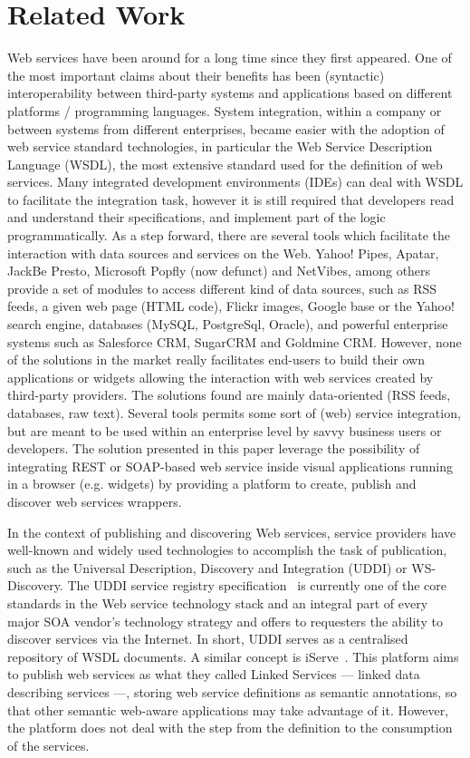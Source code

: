 
\section{Related Work}
\label{sec:related_work}

Web services have been around for a long time since they first appeared.
One of the most important claims about their benefits has been (syntactic) interoperability between third-party systems and applications based on different platforms / programming languages. 
System integration, within a company or between systems from different enterprises, became easier with the adoption of web service standard technologies, in particular the Web Service Description Language (WSDL), the most extensive standard used for the definition of web services. 
Many integrated development environments (IDEs) can deal with WSDL to facilitate the integration task, however it is still required that developers read and understand their specifications, and implement part of the logic programmatically. 
As a step forward, there are several tools which facilitate the interaction with data sources and services on the Web. Yahoo! Pipes, Apatar, JackBe Presto, Microsoft Popfly (now defunct) and NetVibes, among others provide a set of modules to access different kind of data sources, such as RSS feeds, a given web page (HTML code), Flickr images, Google base or the Yahoo! search engine, databases (MySQL, PostgreSql, Oracle), and powerful enterprise systems such as Salesforce CRM, SugarCRM and Goldmine CRM. 
However, none of the solutions in the market really facilitates end-users to build  their own applications or widgets allowing the interaction with web services created by third-party providers. The solutions found are mainly data-oriented (RSS feeds, databases, raw text). Several tools permits some sort of (web) service integration, but are meant to be used within an enterprise level by savvy business users or developers. The solution presented in this paper leverage the possibility of integrating REST or SOAP-based web service inside visual applications running in a browser (e.g. widgets) by providing a platform to create, publish and discover web services wrappers.

In the context of publishing and discovering Web services, service providers have well-known and widely used technologies to accomplish the task of publication, such as the Universal Description, Discovery and Integration (UDDI) or WS-Discovery. The UDDI service registry specification~\cite{uddi2004} is currently one of the core standards in the Web service technology stack and an integral part of every major SOA vendor's technology strategy and offers to requesters the ability to discover services via the Internet. 
In short, UDDI serves as a centralised repository of WSDL documents. A similar concept is iServe~\cite{pedrinaci_ores2010}. This platform aims to publish web services as what they called Linked Services --- linked data describing services ---, storing web service definitions as semantic annotations, so that other semantic web-aware applications may take advantage of it. However, the platform does not deal with the step from the definition to the consumption of the services.

